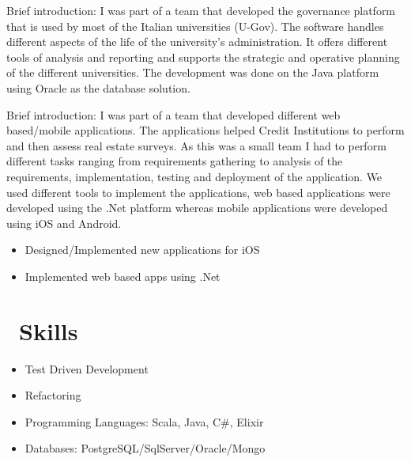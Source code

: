 \documentclass{resume}
\begin{document}
Brief introduction:
I was part of a team that developed the governance platform that is used by most of the Italian universities (U-Gov).
The software handles different aspects of the life of the university's administration. It offers different tools of analysis and reporting and supports the strategic and operative planning of the different universities.
The development was done on the Java platform using Oracle as the database solution.

Brief introduction: I was part of a team that developed different web based/mobile applications.
The applications helped Credit Institutions to perform and then assess real estate surveys.
As this was a small team I had to perform different tasks ranging from requirements gathering to analysis of the requirements, implementation, testing and deployment of the application.
We used different tools to implement the applications, web based applications were developed using the .Net platform whereas mobile applications were developed using iOS and Android.

\begin{itemize}
  \item Designed/Implemented new applications for iOS
  \item Implemented web based apps using .Net
\end{itemize}


\section{\faCogs\ Skills}
\begin{itemize}[parsep=0.5ex]
  \item Test Driven Development
  \item Refactoring
  \item Programming Languages: Scala, Java, C\#, Elixir
  \item Databases: PostgreSQL/SqlServer/Oracle/Mongo
\end{itemize}
\end{document}
